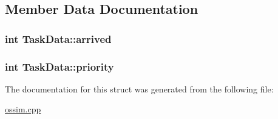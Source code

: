 \subsection{Member Data Documentation}
\subsubsection[{\texorpdfstring{arrived}{arrived}}]{\setlength{\rightskip}{0pt plus 5cm}int Task\+Data\+::arrived}\hypertarget{struct_task_data_a126fafee3369b6a2d8734f4e46c670bc}{}\label{struct_task_data_a126fafee3369b6a2d8734f4e46c670bc}
\subsubsection[{\texorpdfstring{priority}{priority}}]{\setlength{\rightskip}{0pt plus 5cm}int Task\+Data\+::priority}\hypertarget{struct_task_data_a9d8b606897eb428a62d816b71312e1b7}{}\label{struct_task_data_a9d8b606897eb428a62d816b71312e1b7}


The documentation for this struct was generated from the following file\+:\begin{DoxyCompactItemize}
\item 
\hyperlink{ossim_8cpp}{ossim.\+cpp}\end{DoxyCompactItemize}
